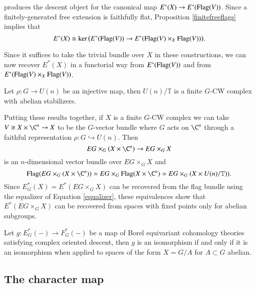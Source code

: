 produces the descent object for the canonical map $E^*(X) \rightarrow E^*(\operatorname{Flag}(V))$. Since a finitely-generated free extension is faithfully flat, Proposition \ref{finitefreeflags} implies that
\begin{equation} \label{equalizer}
E^*(X) \cong \ker \big (E^*(\operatorname{Flag}(V)) \rightarrow E^*(\operatorname{Flag}(V) \times_X \operatorname{Flag}(V)) \big ).
\end{equation}

Since it suffices to take the trivial bundle over $X$ in these constructions, we can now recover $E^*(X)$ in a functorial way from $E^*(\operatorname{Flag}(V))$ and from $E^*(\operatorname{Flag}(V) \times_X \operatorname{Flag}(V))$.

\begin{proposition}
Let $\rho \colon G \rightarrow U(n)$ be an injective map, then $U(n)/\mathbb{T}$ is a finite $G$-CW complex with abelian stabilizers.
\end{proposition}

Putting these results together, if $X$ is a finite $G$-CW complex we can take $V \cong X \times \C^n \rightarrow X$ to be the $G$-vector bundle where $G$ acts on $\C^n$ through a faithful representation $\rho \colon G \hookrightarrow U(n)$. Then 
\[
EG \times_G (X \times \C^n) \rightarrow EG \times_G X
\]
is an $n$-dimensional vector bundle over $EG \times_G X$ and
\[
\Flag(EG \times_G (X \times \C^n)) \simeq EG \times_G \Flag(X \times \C^n) \simeq EG \times_G (X \times U(n)/\mathbb{T})).
\]
Since $E^{*}_{G}(X) = E^*(EG \times_G X)$ can be recovered from the flag bundle using the equalizer of Equation \ref{equalizer}, these equivalences show that $E^*(EG \times_G X)$ can be recovered from spaces with fixed points only for abelian subgroups. 

\begin{proposition} \label{codescent}
Let $g \colon E_{G}^*(-) \rightarrow F_{G}^*(-)$ be a map of Borel equivariant cohomology theories satisfying complex oriented descent, then $g$ is an isomorphism if and only if it is an isomorphism when applied to spaces of the form $X = G/A$ for $A \subset G$ abelian.
\end{proposition}



\subsection*{The character map}

